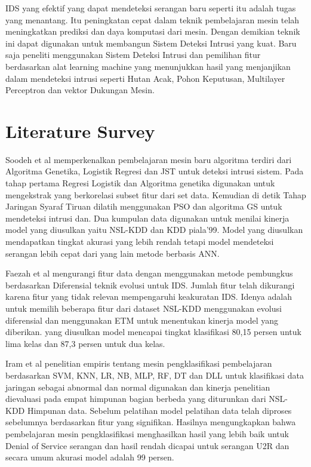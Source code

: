 \documentclass[conference]{IEEEtran}
\begin{document}
IDS yang efektif yang dapat mendeteksi serangan baru seperti itu adalah tugas yang menantang. Itu peningkatan cepat dalam teknik pembelajaran mesin telah meningkatkan prediksi dan daya komputasi dari mesin. Dengan demikian teknik ini dapat digunakan untuk membangun Sistem Deteksi Intrusi yang kuat. Baru saja peneliti menggunakan Sistem Deteksi Intrusi dan pemilihan fitur berdasarkan alat learning machine yang menunjukkan hasil yang menjanjikan dalam mendeteksi intrusi seperti Hutan Acak\cite{ambikavathi2020predictor}, Pohon Keputusan\cite{sarker2020intrudtree}, Multilayer Perceptron\cite{moukhafi2020intelligent} dan vektor Dukungan Mesin\cite{safaldin2021improved}.
\section{Literature Survey}
Soodeh et al\cite{hosseini2020new} memperkenalkan pembelajaran mesin baru algoritma terdiri dari Algoritma Genetika, Logistik Regresi dan JST untuk deteksi intrusi sistem. Pada tahap pertama Regresi Logistik dan Algoritma genetika digunakan untuk mengekstrak yang berkorelasi subset fitur dari set data. Kemudian di detik Tahap Jaringan Syaraf Tiruan dilatih menggunakan PSO dan algoritma GS untuk mendeteksi intrusi dan. Dua kumpulan data digunakan untuk menilai kinerja model yang diusulkan yaitu NSL-KDD dan KDD piala'99. Model yang diusulkan mendapatkan tingkat akurasi yang lebih rendah tetapi model mendeteksi serangan lebih cepat dari yang lain metode berbasis ANN. 

Faezah et al\cite{almasoudya2020differential} mengurangi fitur data dengan menggunakan metode pembungkus berdasarkan Diferensial teknik evolusi untuk IDS. Jumlah fitur telah dikurangi karena fitur yang tidak relevan mempengaruhi keakuratan IDS. Idenya adalah untuk memilih beberapa fitur dari dataset NSL-KDD menggunakan evolusi diferensial dan menggunakan ETM untuk menentukan kinerja model yang diberikan. yang diusulkan model mencapai tingkat klasifikasi 80,15 persen untuk lima kelas dan 87,3 persen  untuk dua kelas. 

Iram et al\cite{abrar2020machine} penelitian empiris tentang mesin pengklasifikasi pembelajaran berdasarkan SVM, KNN, LR, NB, MLP, RF, DT dan DLL untuk klasifikasi data jaringan sebagai abnormal dan normal digunakan dan kinerja penelitian dievaluasi pada empat himpunan bagian berbeda yang diturunkan dari NSL-KDD Himpunan data. Sebelum pelatihan model pelatihan data telah diproses sebelumnya berdasarkan fitur yang signifikan. Hasilnya mengungkapkan bahwa pembelajaran mesin pengklasifikasi menghasilkan hasil yang lebih baik untuk Denial of Service serangan dan hasil rendah dicapai untuk serangan U2R dan secara umum akurasi model adalah 99 persen. 
\end{document}
